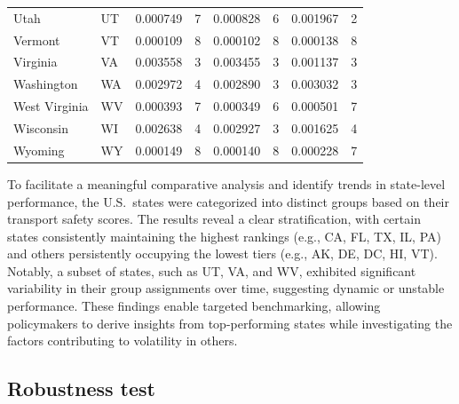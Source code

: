 \documentclass{article}
\begin{document}
\begin{table}[H]
\begin{tabular}{llrrrrrr}
Utah & UT & 0.000749 & 7 & 0.000828 & 6 & 0.001967 & 2 \\
Vermont & VT & 0.000109 & 8 & 0.000102 & 8 & 0.000138 & 8 \\
Virginia & VA & 0.003558 & 3 & 0.003455 & 3 & 0.001137 & 3 \\
Washington & WA & 0.002972 & 4 & 0.002890 & 3 & 0.003032 & 3 \\
West Virginia & WV & 0.000393 & 7 & 0.000349 & 6 & 0.000501 & 7 \\
Wisconsin & WI & 0.002638 & 4 & 0.002927 & 3 & 0.001625 & 4 \\
Wyoming & WY & 0.000149 & 8 & 0.000140 & 8 & 0.000228 & 7 \\
\bottomrule
\end{tabular}
\end{table}

To facilitate a meaningful comparative analysis and identify trends in state-level performance, the U.S.\ states were categorized into distinct groups based on their transport safety scores. The results reveal a clear stratification, with certain states consistently maintaining the highest rankings (e.g., CA, FL, TX, IL, PA) and others persistently occupying the lowest tiers (e.g., AK, DE, DC, HI, VT). Notably, a subset of states, such as UT, VA, and WV, exhibited significant variability in their group assignments over time, suggesting dynamic or unstable performance. These findings enable targeted benchmarking, allowing policymakers to derive insights from top-performing states while investigating the factors contributing to volatility in others.

\subsection{Robustness test}
\end{document}
